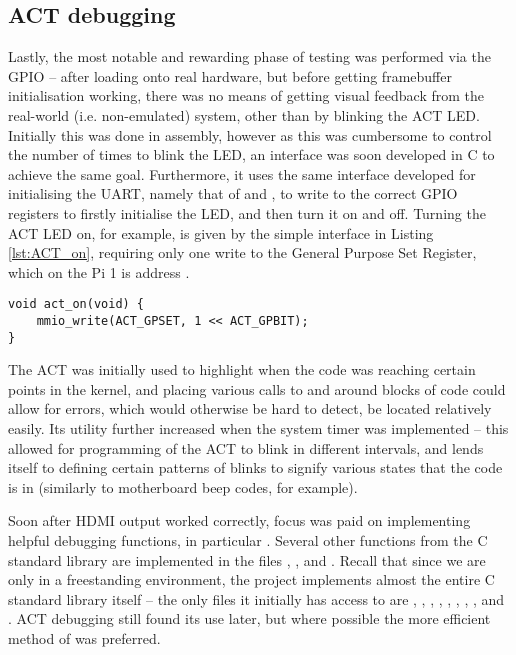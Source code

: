 \subsection{ACT debugging}
    Lastly, the most notable and rewarding phase of testing was performed via
    the GPIO -- after loading onto real hardware, but before getting framebuffer
    initialisation working, there was no means of getting visual feedback from
    the real-world (i.e. non-emulated) system, other than by blinking the ACT
    LED. Initially this was done in assembly, however as this was cumbersome to
    control the number of times to blink the LED, an interface was soon
    developed in C to achieve the same goal. Furthermore, it uses the same
    interface developed for initialising the UART, namely that of
     and , to write to the correct
    GPIO registers to firstly initialise the LED, and then turn it on and off.
    Turning the ACT LED on, for example, is given by the simple interface in
    Listing \ref{lst:ACT_on}, requiring only one write to the General Purpose
    Set Register, which on the Pi 1 is address .

    \lstset{language=c}
    \begin{lstlisting}[caption={Interface for controlling the
    ACT},captionpos=b,label={lst:ACT_on}]
void act_on(void) {
    mmio_write(ACT_GPSET, 1 << ACT_GPBIT);
}
    \end{lstlisting}

    The ACT was initially used to highlight when the code was reaching certain
    points in the kernel, and placing various calls to  and
     around blocks of code could allow for errors, which would
    otherwise be hard to detect, be located relatively easily. Its utility
    further increased when the system timer was implemented -- this allowed for
    programming of the ACT to blink in different intervals, and lends itself to
    defining certain patterns of blinks to signify various states that the code
    is in (similarly to motherboard beep codes, for example).

    Soon after HDMI output worked correctly, focus was paid on implementing
    helpful debugging functions, in particular . Several other
    functions from the C standard library are implemented in the files
    , , and . Recall that since we
    are only in a freestanding environment, the project implements almost the
    entire C standard library itself -- the only files it initially has access
    to are , , ,
    , , ,
    , , and . ACT
    debugging still found its use later, but where possible the more efficient
    method of  was preferred.
